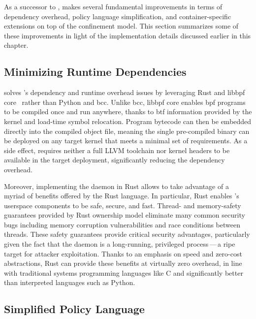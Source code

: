 As a successor to \bpfbox{}, \bpfcontain{} makes several fundamental improvements in terms
of dependency overhead, policy language simplification, and container-specific extensions
on top of the \bpfbox{} confinement model. This section summarizes some of these
improvements in light of the implementation details discussed earlier in this chapter.

\subsection{Minimizing Runtime Dependencies}%
\label{ss:bpfcontain-minimizing}

\bpfcontain{} solves \bpfbox{}'s dependency and runtime overhead issues by leveraging Rust
and libbpf \gls{core}~\cite{nakryiko2020_core} rather than Python and bcc.  Unlike bcc,
libbpf \gls{core} enables \gls{bpf} programs to be compiled once and run anywhere, thanks
to \gls{btf} information provided by the kernel and load-time symbol relocation. Program
bytecode can then be embedded directly into the compiled object file, meaning the single
pre-compiled \bpfcontain{} binary can be deployed on any target kernel that meets
a minimal set of requirements. As a side effect, \bpfcontain{} requires neither a full
LLVM toolchain nor kernel headers to be available in the target deployment, significantly
reducing the dependency overhead.

Moreover, implementing the \bpfcontain{} daemon in Rust allows \bpfcontain{} to take
advantage of a myriad of benefits offered by the Rust language. In particular, Rust
enables \bpfcontain{}'s userspace components to be safe, secure, and fast. Thread- and
memory-safety guarantees provided by Rust ownership model eliminate many common security
bugs including memory corruption vulnerabilities and race conditions between threads.
These safety guarantees provide critical security advantages, particularly given the fact
that the \bpfcontain{} daemon is a long-running, privileged process\,---\,a ripe target
for attacker exploitation. Thanks to an emphasis on speed and zero-cost abstractions, Rust
can provide these benefits at virtually zero overhead, in line with traditional systems
programming languages like C and significantly better than interpreted languages such as
Python.

\subsection{Simplified Policy Language}%
\label{ss:bpfcontain-simplified}

